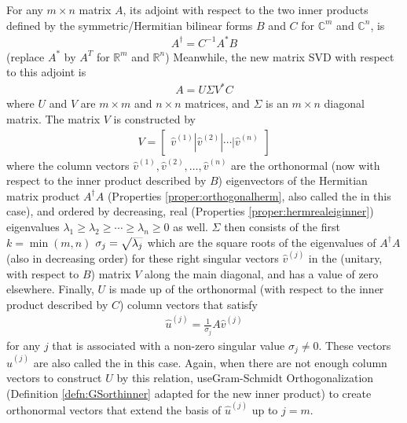 \begin{defn}
\label{defn:SVDadjoint}
For any $m \times n$ matrix $A$, its adjoint with respect to the two inner products defined by the symmetric/Hermitian bilinear forms $B$ and $C$ for $\mathbb{C}^m$ and $\mathbb{C}^n$, is
\begin{align}
A^\dag = C^{-1} A^* B \label{eqn:altadjoint}
\end{align}
(replace $A^*$ by $A^T$ for $\mathbb{R}^m$ and $\mathbb{R}^n$) Meanwhile, the new matrix SVD with respect to this adjoint is
\begin{align}
A = U\Sigma V^*C \label{eqn:SVDadjoint}
\end{align}
where $U$ and $V$ are $m \times m$ and $n \times n$ matrices, and $\Sigma$ is an $m \times n$ diagonal matrix. The matrix $V$ is constructed by
\begin{align}
V = 
\begin{bmatrix}
\hat{v}^{(1)} | \hat{v}^{(2)} | \cdots | \hat{v}^{(n)}
\end{bmatrix}
\end{align}
where the column vectors $\hat{v}^{(1)}, \hat{v}^{(2)}, \ldots, \hat{v}^{(n)}$ are the orthonormal (now with respect to the inner product described by $B$) eigenvectors of the Hermitian matrix product $A^\dag A$ (Properties \ref{proper:orthogonalherm}, also called the  in this case), and ordered by decreasing, real (Properties 
\ref{proper:hermrealeiginner}) eigenvalues $\lambda_1 \geq \lambda_2 \geq \cdots \geq \lambda_n \geq 0$ as well. $\Sigma$ then consists of the first $k = \min(m,n)$  $\sigma_j = \smash{\sqrt{\lambda_j}}$ which are the square roots of the eigenvalues of $A^\dag A$ (also in decreasing order) for these right singular vectors $\hat{v}^{(j)}$ in the (unitary, with respect to $B$) matrix $V$ along the main diagonal, and has a value of zero elsewhere. Finally, $U$ is made up of the orthonormal (with respect to the inner product described by $C$) column vectors that satisfy
\begin{align}
\hat{u}^{(j)} = \frac{1}{\sigma_j} A\hat{v}^{(j)} \label{eqn:leftsingadjoint}
\end{align}
for any $j$ that is associated with a non-zero singular value $\sigma_j \neq 0$. These vectors $\hat{u}^{(j)}$ are also called the  in this case. Again, when there are not enough column vectors to construct $U$ by this relation, useGram-Schmidt Orthogonalization (Definition \ref{defn:GSorthinner} adapted for the new inner product) to create orthonormal vectors that extend the basis of $\hat{u}^{(j)}$ up to $j = m$.
\end{defn}
